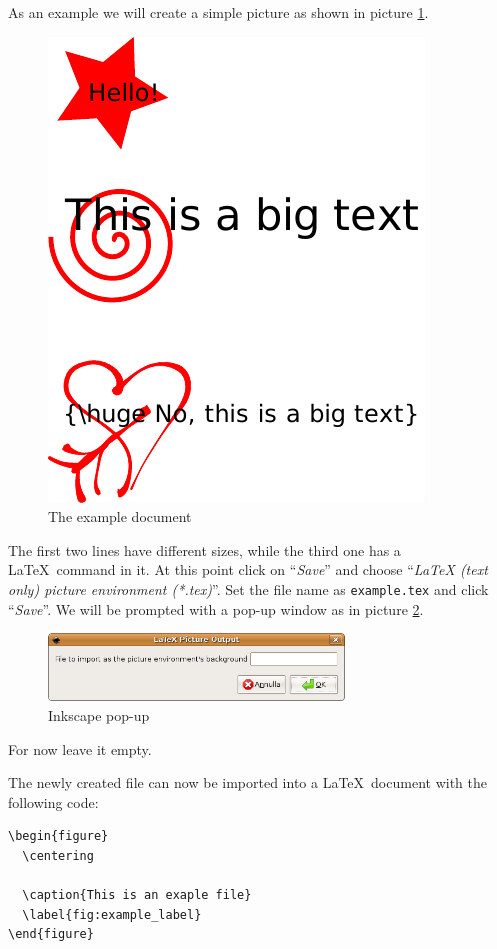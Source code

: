 \documentclass[a4paper,12pt]{article}
\begin{document}
As an example we will create a simple picture as shown in picture \ref{fig:inkscape_tutorial_pic}.
\begin{figure}[tb]
  \centering
  \includegraphics{tutorial_1}
  \caption{The example document}
  \label{fig:inkscape_tutorial_pic}
\end{figure}
The first two lines have different sizes, while the third one has a \LaTeX\ command in it. At this point click on ``\emph{Save}'' and choose ``\emph{LaTeX (text only) picture environment (*.tex)}''. Set the file name as \texttt{example.tex} and click ``\emph{Save}''. We will be prompted with a pop-up window as in picture \ref{fig:inkscape_screenshot}.
\begin{figure}[tb]
  \centering
  \includegraphics[width=0.7\textwidth]{tutorial_2}
  \caption{Inkscape pop-up}
  \label{fig:inkscape_screenshot}
\end{figure}
For now leave it empty.

The newly created file can now be imported into a \LaTeX\ document with the following code:
\begin{verbatim}
\begin{figure}
  \centering
  
  \caption{This is an exaple file}
  \label{fig:example_label}
\end{figure}
\end{verbatim}
\end{document}
